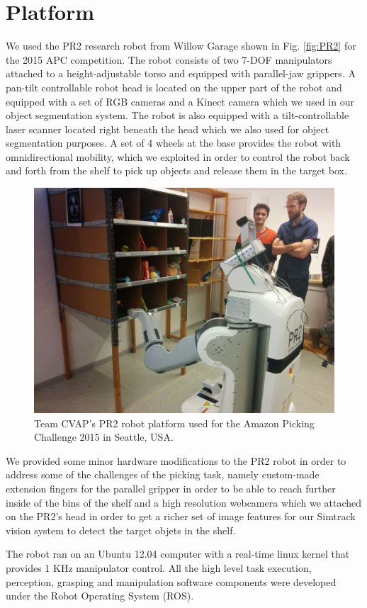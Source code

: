 \section{Platform}
\label{sec:platform}

We used the PR2 research robot from Willow Garage shown in Fig.
\ref{fig:PR2} for the 2015 APC competition. The robot consists of two
7-DOF manipulators attached to a height-adjustable torso and equipped with parallel-jaw
grippers. A pan-tilt controllable robot head is located on the upper part of the robot
and equipped with a set of RGB cameras and a Kinect camera which we used in
our object segmentation system. The robot is also
equipped with a tilt-controllable laser scanner located right beneath the head which we
also used for object segmentation purposes.
A set of 4 wheels at the base provides the robot with omnidirectional mobility, which we
exploited in order to control the robot back and forth from the shelf to pick up objects
and release them in the target box.


\begin{figure}[h]
\centering
\includegraphics[trim=15.0cm 4.0cm 6.0cm 0cm,clip=true,scale=0.07]{figures/pr2.jpg}
\caption{Team CVAP's PR2 robot platform used for the Amazon Picking Challenge 2015 in Seattle, USA.}\label{fig:baxter}
\end{figure}

We provided some minor hardware modifications to the PR2 robot in order to
address some of the challenges  of the picking task,
namely custom-made extension fingers for the parallel gripper in order
to be able to reach further inside of the bins of the shelf and a high resolution
webcamera which we attached on the PR2's head in order to get
a richer set of image features for our Simtrack vision system to detect the target 
objets in the shelf.

The robot ran on an Ubuntu 12.04 computer with a real-time linux kernel that provides
1 KHz manipulator control. All the high level task execution, perception, grasping and manipulation software components were developed under the Robot Operating System (ROS).
